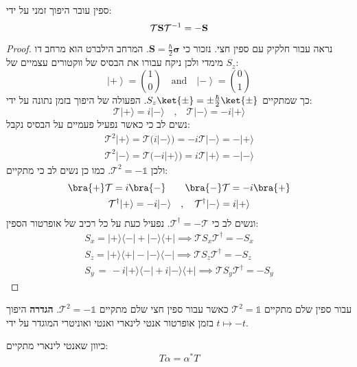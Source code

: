 \documentclass{tstextbook}
\begin{document}
\begin{proposition}
ספין עובר היפוך זמני על ידי:
$$\mathcal{T}{\bf S}\mathcal{T}^{-1}=-{\bf S}$$

\end{proposition}
\begin{proof}
נראה עבור חלקיק עם ספין חצי. נזכור כי \(\mathbf{S}=\frac{\hbar}{2}\boldsymbol\sigma\). המרחב הילברט הוא מרחב דו מימדי ולכן ניקח עבורו את הבסיס של ווקטורים עצמיים של \(S_{z}\):
$$\left|+\right>={\binom{1}{0}}\quad{\mathrm{and}}\quad\left|-\right>={\binom{0}{1}}$$
כך שמתקיים \(S_{z}\ket{\pm}=\pm \frac{\hbar}{2}\ket{\pm}\). הפעולה של היפוך בזמן נתונה על ידי:
$$\mathcal{T}|+\rangle=i|-\rangle\,\,\,\,\,\,,\,\,\,\,\,\mathcal{T}|-\rangle=-i|+\rangle$$
נשים לב כי כאשר נפעיל פעמיים על הבסיס נקבל:
\begin{gather*}\mathcal{T}^{2}|+\rangle=\mathcal{T}(i|-\rangle)=-i\mathcal{T}|-\rangle=-|+\rangle \\\mathcal{T}^{2}|-\rangle=\mathcal{T}(-i|+\rangle)=i\mathcal{T}|+\rangle=-|-\rangle
\end{gather*}
ולכן \(\mathcal{T}^{2}=-\mathbb{1}\). כמו כן נשים לב כי מתקיים:
\begin{gather*}\bra{+} \mathcal{T} =i\bra{-} \qquad\bra{-} \mathcal{T} =-i\bra{+}  \\\mathcal{T}^{\dagger}|+\rangle=-i|-\rangle\quad,\quad\mathcal{T}^{\dagger}|-\rangle=i|+\rangle
\end{gather*}
ונשים לב כי \(\mathcal{T}^{\dagger}=-\mathcal{T}\). נפעיל כעת על כל רכיב של אופרטור הספין:
\begin{gather*}S_{x}=|+\rangle\langle-|+|-\rangle\langle+|\implies\mathcal{T} S_{x}\mathcal{T}^{\dagger}=-S_{x} \\S_{z}=|+\rangle\langle+|-|-\rangle\langle-|\implies\mathcal{T} S_{z}\mathcal{T}^{\dagger}=-S_{z} \\S_{y}\,=\,-i|+\rangle\langle-|+i|-\rangle\langle+|\implies\mathcal{T} S_{y}\mathcal{T}^{\dagger}=-S_{y}
\end{gather*}

\end{proof}
\begin{proposition}
עבור ספין שלם מתקיים \(\mathcal{T}^{2}=\mathbb{1}\) כאשר עבור ספין חצי שלם מתקיים \(\mathcal{T}^{2}=-\mathbb{1}\).
\textbf{הגדרה} היפוך בזמן
אופרטור אנטי לינארי ואנטי ואוניטרי המוגדר על ידי \(t\mapsto -t\).

\end{proposition}
\begin{corollary}
כיוון שאנטי לינארי מתקיים:
$$T\alpha=\alpha^{*}T$$

\end{corollary}
\end{document}
